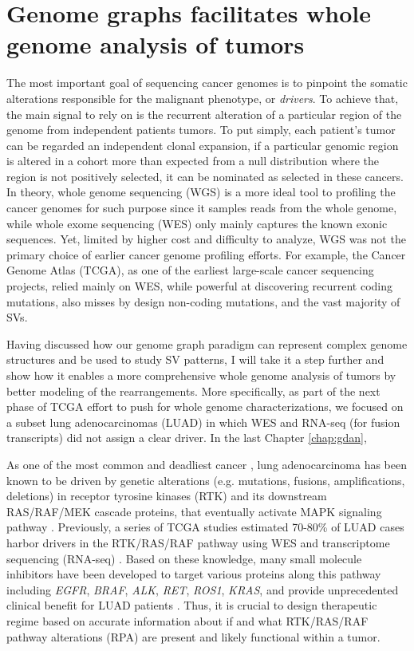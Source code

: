 \documentclass[phd,tocprelim]{cornell}
\begin{document}
\section{Genome graphs facilitates whole genome analysis of tumors}
The most important goal of sequencing cancer genomes is to pinpoint the somatic alterations responsible for the malignant phenotype, or \textit{drivers}. To achieve that, the main signal to rely on is the recurrent alteration of a particular region of the genome from independent patients tumors. To put simply, each patient's tumor can be regarded an independent clonal expansion, if a particular genomic region is altered in a cohort more than expected from a null distribution where the region is not positively selected, it can be nominated as selected in these cancers. In theory, whole genome sequencing (WGS) is a more ideal tool to profiling the cancer genomes for such purpose since it samples reads from the whole genome, while whole exome sequencing (WES) only mainly captures the known exonic sequences. Yet, limited by higher cost and difficulty to analyze, WGS was not the primary choice of earlier cancer genome profiling efforts. For example, the Cancer Genome Atlas (TCGA), as one of the earliest large-scale cancer sequencing projects, relied mainly on WES, while powerful at discovering recurrent coding mutations, also misses by design non-coding mutations, and the vast majority of SVs.

Having discussed how our genome graph paradigm can represent complex genome structures and be used to study SV patterns, I will take it a step further and show how it enables a more comprehensive whole genome analysis of tumors by better modeling of the rearrangements. More specifically, as part of the next phase of TCGA effort to push for whole genome characterizations, we focused on a subset lung adenocarcinomas (LUAD) in which WES and RNA-seq (for fusion transcripts) did not assign a clear driver. In the last Chapter \ref{chap:gdan}, 

As one of the most common and deadliest cancer \cite{Siegel2019-gb}, lung adenocarcinoma has been known to be driven by genetic alterations (e.g. mutations, fusions, amplifications, deletions) in receptor tyrosine kinases (RTK) and its downstream RAS/RAF/MEK cascade proteins, that eventually activate MAPK signaling pathway \cite{Desai2014-qe}. Previously, a series of TCGA studies estimated 70-80\% of LUAD cases harbor drivers in the RTK/RAS/RAF pathway using WES and transcriptome sequencing (RNA-seq) \cite{Campbell2016-xv,Cancer_Genome_Atlas_Research_Network2014-ju,Imielinski2012-vv}. Based on these knowledge, many small molecule inhibitors have been developed to target various proteins along this pathway including \textit{EGFR}, \textit{BRAF}, \textit{ALK}, \textit{RET}, \textit{ROS1}, \textit{KRAS}, and provide unprecedented clinical benefit for LUAD patients \cite{Zhong2021-st}. Thus, it is crucial to design therapeutic regime based on accurate information about if and what RTK/RAS/RAF pathway alterations (RPA) are present and likely functional within a tumor.
\end{document}
